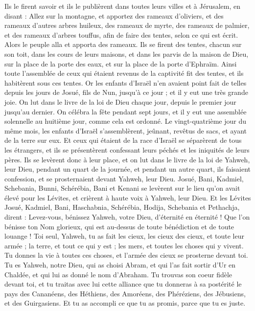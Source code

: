 \begin{multicols}{2}
Ils le firent savoir et ils le publièrent dans toutes leurs villes et à Jérusalem, en disant : Allez sur la montagne, et apportez des rameaux d'oliviers, et des rameaux d'autres arbres huileux, des rameaux de myrte, des rameaux de palmier, et des rameaux d’arbres touffus, afin de faire des tentes, selon ce qui est écrit.
Alors le peuple alla et apporta des rameaux. Ils se firent des tentes, chacun sur son toit, dans les cours de leurs maisons, et dans les parvis de la maison de Dieu, sur la place de la porte des eaux, et sur la place de la porte d'Ephraïm.
Ainsi toute l'assemblée de ceux qui étaient revenus de la captivité fit des tentes, et ils habitèrent sous ces tentes. Or les enfants d'Israël n'en avaient point fait de telles depuis les jours de Josué, fils de Nun, jusqu'à ce jour ; et il y eut une très grande joie.
On lut dans le livre de la loi de Dieu chaque jour, depuis le premier jour jusqu'au dernier. On célébra la fête pendant sept jours, et il y eut une assemblée solennelle au huitième jour, comme cela est ordonné.
\VerseOne{}Le vingt-quatrième jour du même mois, les enfants d'Israël s'assemblèrent, jeûnant, revêtus de sacs, et ayant de la terre sur eux.
Et ceux qui étaient de la race d'Israël se séparèrent de tous les étrangers, et ils se présentèrent confessant leurs péchés et les iniquités de leurs pères.
Ils se levèrent donc à leur place, et on lut dans le livre de la loi de Yahweh, leur Dieu, pendant un quart de la journée, et pendant un autre quart, ils faisaient confession, et se prosternaient devant Yahweh, leur Dieu.
Josué, Bani, Kadmiel, Schebania, Bunni, Schérébia, Bani et Kenani se levèrent sur le lieu qu'on avait élevé pour les Lévites, et crièrent à haute voix à Yahweh, leur Dieu.
Et les Lévites Josué, Kadmiel, Bani, Haschabnia, Schérébia, Hodija, Schebania et Pethachja, dirent : Levez-vous, bénissez Yahweh, votre Dieu, d'éternité en éternité ! Que l’on bénisse ton Nom glorieux, qui est au-dessus de toute bénédiction et de toute louange !
Toi seul, Yahweh, tu as fait les cieux, les cieux des cieux, et toute leur armée ; la terre, et tout ce qui y est ; les mers, et toutes les choses qui y vivent. Tu donnes la vie à toutes ces choses, et l'armée des cieux se prosterne devant toi.
Tu es Yahweh, notre Dieu, qui as choisi Abram, et qui l’as fait sortir d'Ur en Chaldée, et qui lui as donné le nom d'Abraham.
Tu trouvas son coeur fidèle devant toi, et tu traitas avec lui cette alliance que tu donneras à sa postérité le pays des Cananéens, des Héthiens, des Amoréens, des Phéréziens, des Jébusiens, et des Guirgasiens. Et tu as accompli ce que tu as promis, parce que tu es juste.

\end{multicols}
